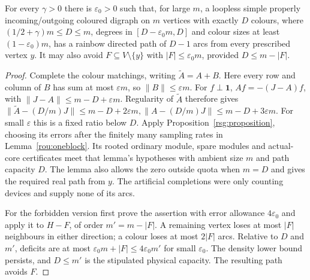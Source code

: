 \begin{theorem}
\label{pf:theorem}
For every $\gamma>0$ there is $\varepsilon_0>0$ such that, for large $m$, a loopless simple properly incoming/outgoing coloured digraph on $m$ vertices with exactly $D$ colours, where $(1/2+\gamma)m\le{}D\le{}m$, degrees in $[D-\varepsilon_0m,D]$ and colour sizes at least $(1-\varepsilon_0)m$, has a rainbow directed path of $D-1$ arcs from every prescribed vertex $y$.  It may also avoid $F\subseteq{}V\setminus\{y\}$ with $|F|\le\varepsilon_0m$, provided $D\le{}m-|F|$.
\end{theorem}
\begin{proof}
Complete the colour matchings, writing $\widetilde{A}=A+B$. Here every row and column of $B$ has sum at most $\varepsilon{}m$, so $\|B\|\le\varepsilon{}m$.  For $f\perp\mathbf1$, $Af=-(J-A)f$, with $\|J-A\|\le{}m-D+\varepsilon{}m$. Regularity of $\widetilde{A}$ therefore gives $\|\widetilde{A}-(D/m)J\|\le{}m-D+2\varepsilon{}m,\|A-(D/m)J\|\le{}m-D+3\varepsilon{}m$. For small $\varepsilon$ this is a fixed ratio below $D$. Apply Proposition~\ref{rsg:proposition}, choosing its errors after
the finitely many sampling rates in Lemma~\ref{rou:oneblock}.
Its rooted ordinary module, spare modules and actual-core certificates
meet that lemma's hypotheses with ambient size $m$ and path capacity $D$.  The lemma also allows the zero outside quota when $m=D$ and gives the required real path from $y$.  The artificial completions were only counting devices and supply none of its arcs.

For the forbidden version first prove the assertion with error
allowance $4\varepsilon_0$ and apply it to $H-F$, of order $m'=m-|F|$.  A remaining vertex loses at most $|F|$ neighbours in either direction; a colour loses at most $2|F|$ arcs.  Relative to $D$ and $m'$, deficits are at most $\varepsilon_0m+|F|\le4\varepsilon_0m'$ for small $\varepsilon_0$. The density lower bound persists, and $D\le{}m'$ is the stipulated physical capacity.  The resulting path avoids $F$.
\end{proof}
